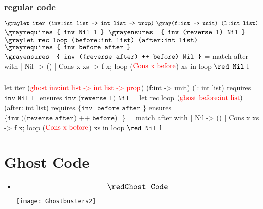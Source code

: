 \documentclass[xcolor=dvipsnames]{beamer}
\begin{document}
\begin{frame}[fragile]
\frametitle{regular code}
\hspace*{-1em}
\begin{footnotesize}
\begin{whycode}
${\gray\texttt{let iter (inv:int list -> int list -> prop)}} ~
{\gray\texttt{(f:int -> unit) (l:int list)}}$
${\gray\texttt{requires \{ inv Nil l \}}}$
${\gray\texttt{ensures~ \{ inv (reverse l) Nil \}}}$    
= ${\gray\texttt{let rec loop (before:int list) (after:int list)}}$
  ${\gray\texttt{requires \{ inv before after \} }}$
  ${\gray\texttt{ensures~ \{ inv ((reverse after) ++ before) Nil \}}}$
  = match after with 
     | Nil       -> ()
     | Cons x xs -> f x; loop ($\textcolor{red}{\text{Cons x before}}$) xs 
  in loop $\texttt{\red Nil}$ l 
\end{whycode}
\end{footnotesize}
\end{frame}
\addtocounter{framenumber}{-1}

\begin{frame}[fragile]
\frametitle{}
\begin{footnotesize}
\begin{whycode}
let iter ($\textcolor{red}{\text{ghost inv:int list -> int list -> prop}}$) (f:int -> unit) (l: int list)
requires { ${ \texttt{inv Nil l }}$ }
ensures  { ${ \texttt{inv (reverse l) Nil}}$ }
= let rec loop $(\textcolor{red}{\text{ghost before:int list}})$ (after: int list) 
  requires $\texttt{\{ inv { before after} \}}$
  ensures  $\texttt{\{ inv {((reverse after) ++ before)} }\}$     
  = match after with 
     | Nil       -> ()
     | Cons x xs -> f x; loop ($\textcolor{red}{\text{Cons x before}}$) xs 
  in loop $\texttt{\red Nil}$ l 
\end{whycode}
\end{footnotesize}
\end{frame}
\addtocounter{framenumber}{-1}



\section*{Ghost Code}

\begin{frame}
 \begin{itemize}
 	\item[] $${\large \red \texttt{Ghost Code}}$$
 	\begin{center}
 	\texttt{[image: Ghostbusters2]}
 	\end{center} 
 \end{itemize}
\end{frame}
\addtocounter{framenumber}{-1}
\end{document}

